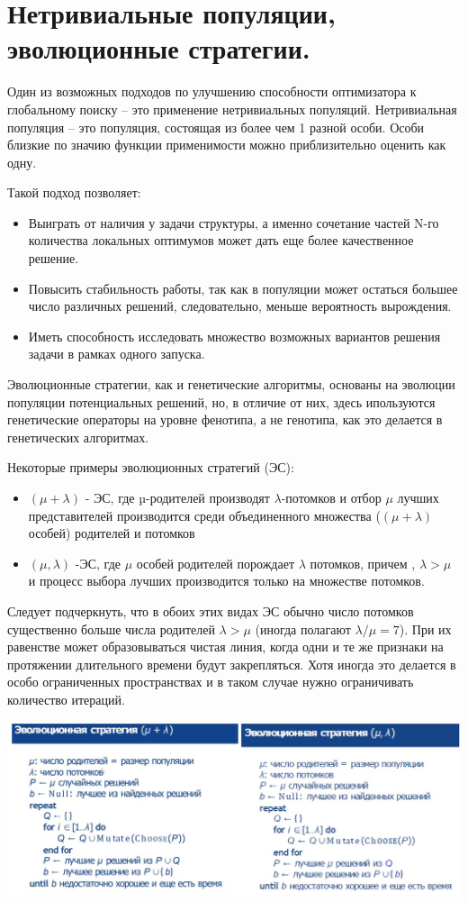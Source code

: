 \section{Нетривиальные популяции, эволюционные стратегии.}
    Один из возможных подходов по улучшению способности оптимизатора к глобальному поиску – это применение {нетривиальных популяций}. Нетривиальная популяция – это популяция, состоящая  из более чем 1 разной особи. Особи близкие по значию функции применимости можно приблизительно оценить как одну.
    
    Такой подход позволяет:
    \begin{itemize}
      \item Выиграть от наличия у задачи структуры, а именно сочетание частей N-го количества локальных оптимумов может дать еще более качественное решение. 
      \item Повысить стабильность работы, так как в популяции может остаться большее число различных решений, следовательно, меньше вероятность вырождения. 
      \item Иметь способность исследовать множество возможных вариантов решения задачи в рамках одного запуска.
   \end{itemize}
   Эволюционные стратегии, как и генетические алгоритмы, основаны на эволюции популяции потенциальных решений, но, в отличие от них, здесь ипользуются генетические операторы на уровне фенотипа, а не генотипа, как это делается в генетических алгоритмах.
   
   Некоторые примеры эволюционных стратегий (ЭС):
    \begin{itemize}
    \item $(\mu + \lambda)$ - ЭС, где  µ-родителей производят $\lambda$-потомков и отбор $\mu$ лучших представителей производится среди объединенного множества ($(\mu + \lambda)$ особей) родителей и потомков
    \item $(\mu , \lambda)$ -ЭС, где $\mu$ особей родителей порождает  $\lambda$ потомков, причем ,  $\lambda > \mu$ и процесс выбора лучших производится только на множестве потомков.
    \end{itemize}
    
    Следует подчеркнуть, что в обоих этих видах ЭС обычно число потомков существенно больше числа родителей  $\lambda > \mu$ (иногда полагают  $\lambda/ \mu = 7$). При их равенстве может образовываться чистая линия, когда одни и те же признаки на протяжении длительного времени будут закрепляться. Хотя иногда это делается в особо ограниченных пространствах и в таком случае нужно ограничивать количество итераций. 

    \includegraphics[width=\textwidth]{images/11bilet.jpg}   